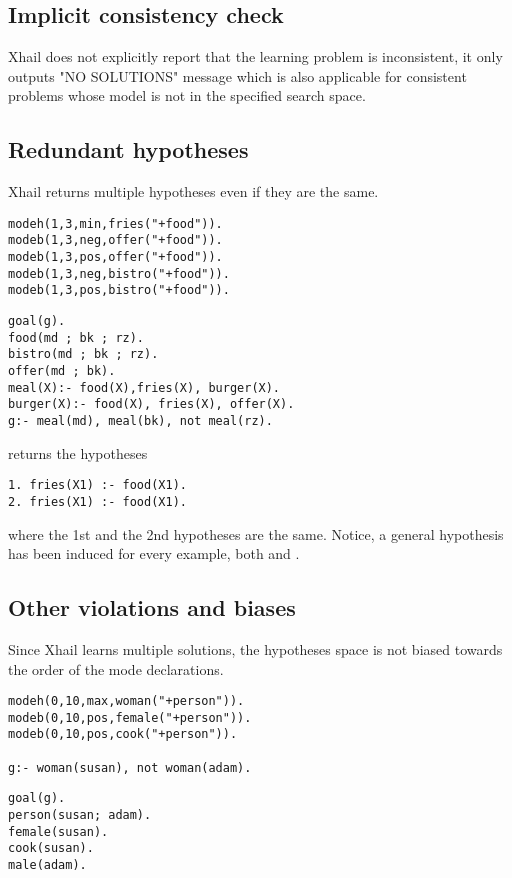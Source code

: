 \subsection{Implicit consistency check}
Xhail does not explicitly report that the learning problem is inconsistent, it only outputs "NO SOLUTIONS" message which is also applicable for consistent problems whose model is not in the specified search space.

\subsection{Redundant hypotheses}
Xhail returns multiple hypotheses even if they are the same.

\begin{minipage}[t]{.43\textwidth}
\begin{lstlisting}
modeh(1,3,min,fries("+food")).
modeb(1,3,neg,offer("+food")).
modeb(1,3,pos,offer("+food")).
modeb(1,3,neg,bistro("+food")).
modeb(1,3,pos,bistro("+food")).
\end{lstlisting}
\end{minipage}
\begin{minipage}[t]{.20\textwidth}
\begin{lstlisting}
goal(g).
food(md ; bk ; rz).
bistro(md ; bk ; rz).
offer(md ; bk).
meal(X):- food(X),fries(X), burger(X).
burger(X):- food(X), fries(X), offer(X).
g:- meal(md), meal(bk), not meal(rz).
\end{lstlisting}
\end{minipage}

returns the hypotheses

\begin{lstlisting}
1. fries(X1) :- food(X1).
2. fries(X1) :- food(X1).
\end{lstlisting}
where the 1st and the 2nd hypotheses are the same. Notice, a general hypothesis has been induced for every example, both  and .

\subsection{Other violations and biases}
Since Xhail learns multiple solutions, the hypotheses space is not biased towards the order of the mode declarations.

\begin{minipage}[t]{.50\textwidth}
\begin{lstlisting}
modeh(0,10,max,woman("+person")).
modeb(0,10,pos,female("+person")).
modeb(0,10,pos,cook("+person")).

g:- woman(susan), not woman(adam).
\end{lstlisting}
\end{minipage}
\begin{minipage}[t]{.20\textwidth}
\begin{lstlisting}
goal(g).
person(susan; adam).
female(susan).
cook(susan).
male(adam).
\end{lstlisting}
\end{minipage}

